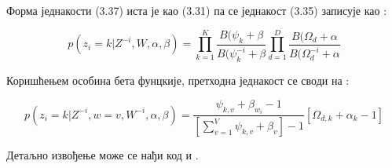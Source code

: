 Форма једнакости (3.37) иста је као (3.31) па се једнакост (3.35) записује као :

\begin{equation}
p(z_i=k|Z^{-i},W,\alpha,\beta) = \prod_{k=1}^K\frac{B(\psi_k + \beta}{B(\psi_k^{-i}+\beta}\prod_{d=1}^D\frac{B(\Omega_d + \alpha}{B(\Omega_d^{-i} + \alpha}
\end{equation}

Коришћењем особина бета фунцкије, претходна једнакост се своди на :

\begin{equation}
p(z_i=k|Z^{-i},w=v,W^{-i},\alpha,\beta) = \frac{\psi_{k,v}+\beta_{w_i}-1}{\left[ \sum_{v=1}^V \psi_{k,v}+\beta_v \right] -1}\left[\Omega_{d,k}+\alpha_k-1 \right]
\end{equation}

Детаљно извођење може се нађи код \cite{verov9} и \cite{verov10}.

